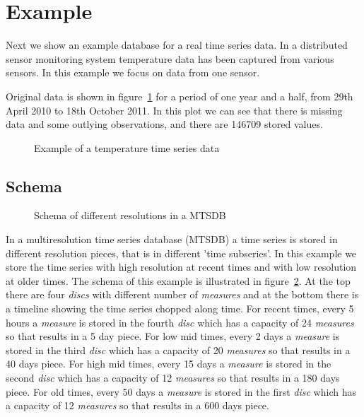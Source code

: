 \section{Example}

Next we show an example database for a real time series data.  In a
distributed sensor monitoring system temperature data has been
captured from various sensors. In this example we focus on data from
one sensor.  

Original data is shown in figure~\ref{fig:exemple:original} for a
period of one year and a half, from 29th April 2010 to 18th October
2011. In this plot we can see that there is missing data and some
outlying observations, and there are 146709 stored values.



\begin{figure}[tp]
  \centering
  
  \caption{Example of a temperature time series data}
  \label{fig:exemple:original}
\end{figure}



\subsection{Schema}

\begin{figure}[tp]
\centering

\caption{Schema of different resolutions in a MTSDB}
\label{fig:exemple:window}
\end{figure}


In a multiresolution time series database (MTSDB) a time series is
stored in different resolution pieces, that is in different 'time
subseries'.  In this example we store the time series with high
resolution at recent times and with low resolution at older times. The
schema of this example is illustrated in
figure~\ref{fig:exemple:window}. At the top there are four
\emph{discs} with different number of \emph{measures} and at the
bottom there is a timeline showing the time series chopped along
time. For recent times, every 5 hours a \emph{measure} is stored in
the fourth \emph{disc} which has a capacity of 24 \emph{measures} so
that results in a 5 day piece. For low mid times, every 2 days a
\emph{measure} is stored in the third \emph{disc} which has a capacity
of 20 \emph{measures} so that results in a 40 days piece. For high mid
times, every 15 days a \emph{measure} is stored in the second
\emph{disc} which has a capacity of 12 \emph{measures} so that results
in a 180 days piece. For old times, every 50 days a \emph{measure} is
stored in the first \emph{disc} which has a capacity of 12
\emph{measures} so that results in a 600 days piece.



